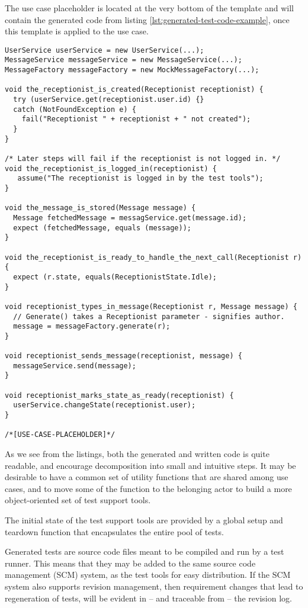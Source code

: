 \noindent The use case placeholder is located at the very bottom of the template and will contain the generated code from listing \ref{lst:generated-test-code-example}, once this template is applied to the use case.
\begin{lstlisting}[style=Dart, caption=Example template methods (written manually),label={lst:example-template-methods}]
UserService userService = new UserService(...);
MessageService messageService = new MessageService(...);
MessageFactory messageFactory = new MockMessageFactory(...);
  
void the_receptionist_is_created(Receptionist receptionist) {
  try (userService.get(receptionist.user.id) {}
  catch (NotFoundException e) {
    fail("Receptionist " + receptionist + " not created");
  }
}

/* Later steps will fail if the receptionist is not logged in. */
void the_receptionist_is_logged_in(receptionist) {
   assume("The receptionist is logged in by the test tools");
}

void the_message_is_stored(Message message) {
  Message fetchedMessage = messagService.get(message.id);
  expect (fetchedMessage, equals (message));
}

void the_receptionist_is_ready_to_handle_the_next_call(Receptionist r) {
  expect (r.state, equals(ReceptionistState.Idle);
}

void receptionist_types_in_message(Receptionist r, Message message) {
  // Generate() takes a Receptionist parameter - signifies author.
  message = messageFactory.generate(r);
}

void receptionist_sends_message(receptionist, message) {
  messageService.send(message);
}

void receptionist_marks_state_as_ready(receptionist) {
  userService.changeState(receptionist.user);
} 

/*[USE-CASE-PLACEHOLDER]*/
\end{lstlisting}
As we see from the listings, both the generated and written code is quite readable, and encourage decomposition into small and intuitive steps. It may be desirable to have a common set of utility functions that are shared among use cases, and to move some of the function to the belonging actor to build a more object-oriented set of test support tools.\medskip

\noindent The initial state of the test support tools are provided by a global setup and teardown function that encapsulates the entire pool of tests.\medskip

\noindent Generated tests are source code files meant to be compiled and run by a test runner. This means that they may be added to the same source code management (SCM) system, as the test tools for easy distribution. If the SCM system also supports revision management, then requirement changes that lead to regeneration of tests, will be evident in -- and traceable from -- the revision log.
